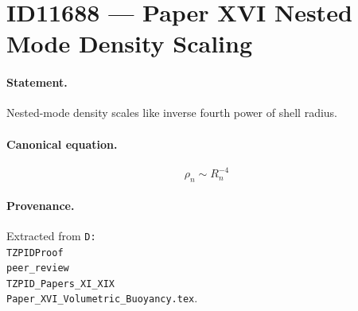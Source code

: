 \section*{ID11688 --- Paper XVI Nested Mode Density Scaling}

\paragraph{Statement.}
Nested-mode density scales like inverse fourth power of shell radius.

\paragraph{Canonical equation.}
\[
\rho_n\sim R_n^{-4}
\]

\paragraph{Provenance.}
Extracted from \texttt{D:\\TZPIDProof\\peer\_review\\TZPID\_Papers\_XI\_XIX\\Paper\_XVI\_Volumetric\_Buoyancy.tex}.
